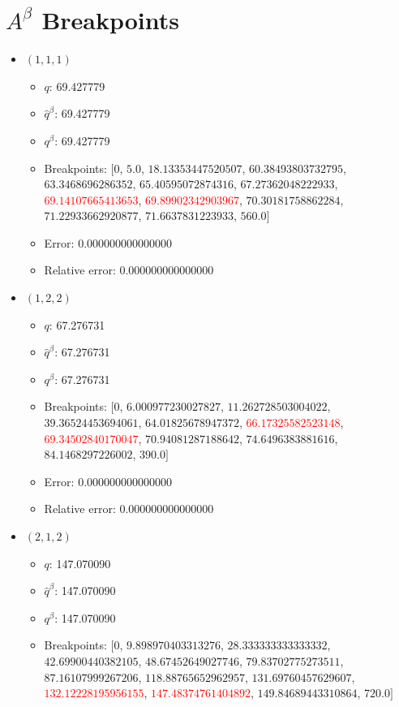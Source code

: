 \documentclass{article}%
\begin{document}
\section{$A^\beta$ Breakpoints}%
\thispagestyle{plain}%
\begin{itemize}%
	\item $(1, 1, 1)$%
	\begin{itemize}%
		\item $q$: 69.427779%
		\item $\hat{q}^\beta$: 69.427779%
		\item $q^\beta$: 69.427779%
		\item Breakpoints: $[$$0$, $5.0$, $18.13353447520507$, $60.38493803732795$, $63.3468696286352$, $65.40595072874316$, $67.27362048222933$, \textcolor{red}{$69.14107665413653$}, \textcolor{red}{$69.89902342903967$}, $70.30181758862284$, $71.22933662920877$, $71.6637831223933$, $560.0$$]$%
		\item Error: 0.000000000000000%
		\item Relative error: 0.000000000000000%
	\end{itemize}%
	\item $(1, 2, 2)$%
	\begin{itemize}%
		\item $q$: 67.276731%
		\item $\hat{q}^\beta$: 67.276731%
		\item $q^\beta$: 67.276731%
		\item Breakpoints: $[$$0$, $6.000977230027827$, $11.262728503004022$, $39.36524453694061$, $64.01825678947372$, \textcolor{red}{$66.17325582523148$}, \textcolor{red}{$69.34502840170047$}, $70.94081287188642$, $74.6496383881616$, $84.1468297226002$, $390.0$$]$%
		\item Error: 0.000000000000000%
		\item Relative error: 0.000000000000000%
	\end{itemize}%
	\item $(2, 1, 2)$%
	\begin{itemize}%
		\item $q$: 147.070090%
		\item $\hat{q}^\beta$: 147.070090%
		\item $q^\beta$: 147.070090%
		\item Breakpoints: $[$$0$, $9.898970403313276$, $28.333333333333332$, $42.69900440382105$, $48.67452649027746$, $79.83702775273511$, $87.16107999267206$, $118.88765652962957$, $131.69760457629607$, \textcolor{red}{$132.12228195956155$}, \textcolor{red}{$147.48374761404892$}, $149.84689443310864$, $720.0$$]$%

\end{itemize}
\end{itemize}
\end{document}
